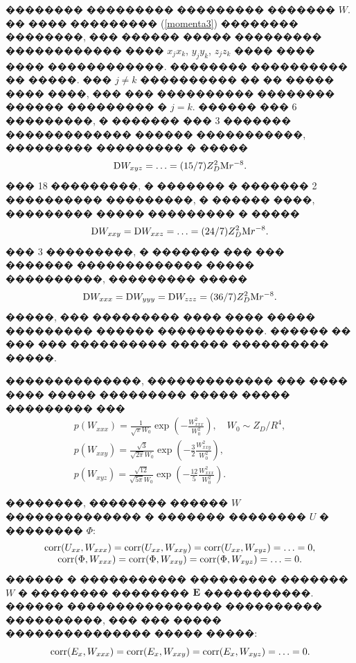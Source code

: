 \documentclass[12pt,titlepage]{article}
\newcommand\M{{\rm M}} %
\newcommand\D{{\rm D}}
\begin{document}
�������� ��������� ��������� ������� $W$. �� ���� ��������� (\ref{momenta3}) �������� ��������, ��� ������ ����� ��������� ������������ ���� $x_j x_k$, $y_j y_k$, $z_j z_k$ ���� ���� ���� ������������. �������� ���������� �� �����. ��� $j \not= k$ ���������� �� �� ����� ���� ����, ��� ��� ���������� �������� ������ ��������� � $j = k$. ������ ��� 6 ���������, � ������� ��� 3 ������� ������������� ������ �����������, ��������� ��������� � �����
\begin{equation}
    \D W_{xyz} = \ldots = (15/7) Z_D^2 \M r^{-8}.
\end{equation}
��� 18 ���������, � ������� � ������� 2 ���������� ���������, � ������ ����, ��������� ����� ��������� � �����
\begin{equation}
    \D W_{xxy} = \D W_{xxz} = \ldots = (24/7) Z_D^2 \M r^{-8}.
\end{equation}
��� 3 ���������, � ������� ��� ��� ������� ������������� ����� ����������, ��������� �����
\begin{equation}
    \D W_{xxx} = \D W_{yyy} = \D W_{zzz} = (36/7) Z_D^2 \M r^{-8}.
\end{equation}
�����, ��� ��������� ���� ���� ����� ��������� ������ �����������. ������ �� ��� ��� ���������� ������ ���������� �����.

��������������, ������������� ��� ���� ���� ����� ��������� ����� ����� ��������� ���
\begin{gather}
    \label{distrib_W_xxx}
    p(W_{xxx}) = \frac{1}{\sqrt{\pi } W_{0} } \exp \left(-\frac{W_{xxx}^{2} }{W_{0}^{2} } \right), \quad W_0 \sim Z_D/R^4, \\
    \label{distrib_W_xxy}
    p(W_{xxy}) = \frac{\sqrt{3}}{\sqrt{2\pi} W_0 } \exp \left(- \frac{3}{2} \frac{W_{xxy}^{2} }{W_{0}^{2} } \right), \\
    \label{distrib_W_xyz}
    p(W_{xyz}) = \frac{\sqrt{12}}{\sqrt{5\pi} W_0 } \exp \left(- \frac{12}{5}\frac{W_{xxx}^{2} }{W_{0}^{2} } \right).
\end{gather}

��������, �������� ������ $W$ �������������� � ������� �������� $U$ � �������� $\Phi$:
\begin{equation}
    \begin{array}{c}
    {\rm corr}(U_{xx}, W_{xxx}) = {\rm corr}(U_{xx}, W_{xxy}) = {\rm corr}(U_{xx}, W_{xyz}) = \ldots = 0, \\
    {\rm corr}(\Phi, W_{xxx}) = {\rm corr}(\Phi, W_{xxy}) = {\rm corr}(\Phi, W_{xyz}) = \ldots = 0.
    \end{array}
\end{equation}
������ � ����������� ��������� ������� $W$ � �������� �������� ${\bf E}$ �����������. ������ ���������������� ���������� ����������, ��� ��� ����� ��������������� ����� �����:
\begin{equation}
    {\rm corr}(E_x, W_{xxx}) = {\rm corr}(E_x, W_{xxy}) = {\rm corr}(E_x, W_{xyz}) = \ldots = 0.
\end{equation}
\end{document}
